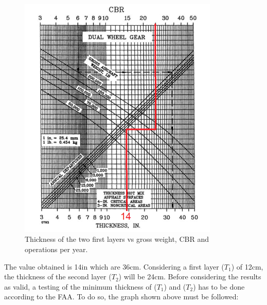 		\begin{figure}[H]
			\centering
			\includegraphics[clip, trim=0cm 0cm 0cm 0cm, width=0.85\textwidth]{./images/pavement/B737/thickness2}
			\caption{Thickness of the two first layers vs gross weight, CBR and operations per year.}
			\label{} %
		\end{figure}
		
		The value obtained is 14in which are 36cm. Considering a first layer (\(T_1\)) of 12cm, the thickness of the second layer (\(T_2\)) will be 24cm. Before considering the results as valid, a testing of the minimum thickness of (\(T_1\)) and (\(T_2\)) has to be done according to the FAA. To do so, the graph shown above must be followed:
		

